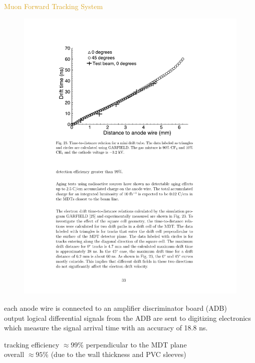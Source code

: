 \begin{frame}{\textcolor{Goldenrod}{Muon Forward Tracking System}}
  \begin{overlayarea}{\textwidth}{\textheight}
    \begin{figure}[h]
      \centering
      \includegraphics[height=0.35\textheight]{./Images/45_MD_miniPDT_03.pdf}
    \end{figure}
    \itt
  \item
    each anode wire is
    connected to an amplifier discriminator board (ADB)\\
    
    output logical differential signals from the ADB are sent to
    digitizing electronics which measure the signal arrival time with
    an accuracy of 18.8 ns.
    
  \item
    tracking efficiency $\approx 99$\% perpendicular to the MDT plane\\
    overall $\approx 95$\% (due to the wall thickness and PVC sleeves) 
    \tti
  \end{overlayarea}
\end{frame}


